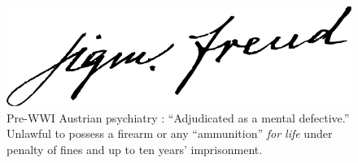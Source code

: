 \documentclass[letterpaper]{article}
\begin{document}
\begin{figure}
\begin{minipage}{0.45\textwidth}
	\end{minipage}\textwidth\begin{minipage}{0.45\textwidth}\centering
	\includegraphics[width=1.0\textwidth]{images/683px-FreudSignature.png}
	\end{minipage}
	\caption[Adjudicated as a mental defective]{Pre-WWI Austrian psychiatry \cite{unknown1909,halberstadt1940,jung-sig,freud-sig,jung-sig-src,freud-sig-src}: ``Adjudicated as a mental defective.'' Unlawful to possess a firearm or any ``ammunition'' \textit{for life} under penalty of fines and up to ten years' imprisonment.}
\end{figure}
\end{document}
